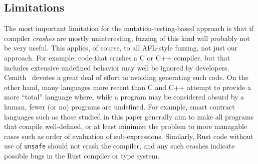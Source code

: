 \subsection{Limitations}

The most important limitation for the mutation-testing-based approach is that if compiler \emph{crashes} are mostly uninteresting, fuzzing of this kind will probably not be very useful.  This applies, of course, to all AFL-style fuzzing, not just our approach.  For example, code that crashes a C or C++ compiler, but that includes extensive undefined behavior may well be ignored by developers.  Csmith~\cite{csmith} devotes a great deal of effort to avoiding generating such code.  On the other hand, many languages more recent than C and C++ attempt to provide a more ``total'' language where, while a program may be considered absurd by a human, fewer (or no) programs are undefined.  For example, smart contract languages such as those studied in this paper generally aim to make all programs that compile well-defined, or at least minimize the problem to more managable cases such as order of evaluation of sub-expressions.  Similarly, Rust code without use of {\tt unsafe} should not crash the compiler, and any such crashes indicate possible bugs in the Rust compiler or type system.  
